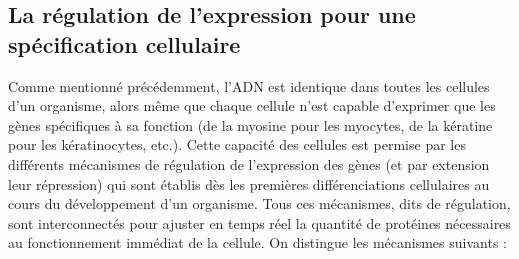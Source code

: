 \subsection{La régulation de l'expression pour une spécification cellulaire}

Comme mentionné précédemment, l'ADN est identique dans toutes les cellules d'un organisme, alors même que chaque cellule n'est capable d'exprimer que les gènes spécifiques à sa fonction (de la myosine pour les myocytes, de la kératine pour les kératinocytes, etc.). Cette capacité des cellules est permise par les différents mécanismes de régulation de l'expression des gènes (et par extension leur répression) qui sont établis dès les premières différenciations cellulaires au cours du développement d'un organisme. Tous ces mécanismes, dits de régulation, sont interconnectés pour ajuster en temps réel la quantité de protéines nécessaires au fonctionnement immédiat de la cellule. On distingue les mécanismes suivants : 
